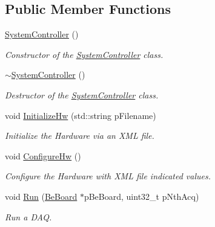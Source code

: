 \subsection*{Public Member Functions}
\begin{DoxyCompactItemize}
\item 
\hyperlink{class_ph2___system_1_1_system_controller_a7755f0304eb845c975862df469f25e70}{System\-Controller} ()
\begin{DoxyCompactList}\small\item\em Constructor of the \hyperlink{class_ph2___system_1_1_system_controller}{System\-Controller} class. \end{DoxyCompactList}\item 
\hyperlink{class_ph2___system_1_1_system_controller_abd794b0a85d9d83ec553d707875efcf1}{$\sim$\-System\-Controller} ()
\begin{DoxyCompactList}\small\item\em Destructor of the \hyperlink{class_ph2___system_1_1_system_controller}{System\-Controller} class. \end{DoxyCompactList}\item 
void \hyperlink{class_ph2___system_1_1_system_controller_ac9ca1c3f04938c5bc1396fa74c3c7bec}{Initialize\-Hw} (std\-::string p\-Filename)
\begin{DoxyCompactList}\small\item\em Initialize the Hardware via an X\-M\-L file. \end{DoxyCompactList}\item 
void \hyperlink{class_ph2___system_1_1_system_controller_af0bb978523eb3a6436650d9e4f112432}{Configure\-Hw} ()
\begin{DoxyCompactList}\small\item\em Configure the Hardware with X\-M\-L file indicated values. \end{DoxyCompactList}\item 
void \hyperlink{class_ph2___system_1_1_system_controller_a566a9fd32ddb038dc935de263a0032f8}{Run} (\hyperlink{class_ph2___hw_description_1_1_be_board}{Be\-Board} $\ast$p\-Be\-Board, uint32\-\_\-t p\-Nth\-Acq)
\begin{DoxyCompactList}\small\item\em Run a D\-A\-Q. \end{DoxyCompactList}\end{DoxyCompactItemize}
